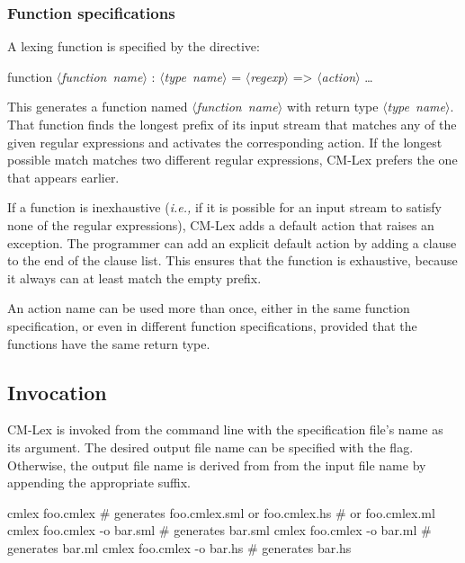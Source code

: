 \documentclass[10pt]{article}
\newcommand{\nonterm}[1]{\mbox{$\langle${\it{}#1}$\rangle$}}
\begin{document}
\subsubsection{Function specifications}

A lexing function is specified by the directive:

\begin{code}
function \nonterm{function name} : \nonterm{type name} =
   \nonterm{regexp} => \nonterm{action}
   \dots
\end{code}

This generates a function named \nonterm{function name} with return type
\nonterm{type name}.  That function finds the longest prefix of its input
stream that matches any of the given regular expressions and activates
the corresponding action.  If the longest possible match matches two
different regular expressions, CM-Lex prefers the one that appears
earlier.

If a function is inexhaustive ({\em i.e.,} if it is possible for an input
stream to satisfy none of the regular expressions), CM-Lex adds a
default action that raises an exception.  The programmer can add an
explicit default action by adding a clause 
to the end of the clause list.  This ensures that the function is
exhaustive, because it always can at least match the empty prefix.

An action name can be used more than once, either in the same function
specification, or even in different function specifications, provided
that the functions have the same return type.


\subsection{Invocation}

CM-Lex is invoked from the command line with the specification file's
name as its argument.  The desired output file name can be specified
with the  flag.  Otherwise, the output file name is derived from from
the input file name by appending the appropriate suffix.

\begin{code}
cmlex foo.cmlex               # generates foo.cmlex.sml or foo.cmlex.hs
                              #   or foo.cmlex.ml
cmlex foo.cmlex -o bar.sml    # generates bar.sml
cmlex foo.cmlex -o bar.ml     # generates bar.ml
cmlex foo.cmlex -o bar.hs     # generates bar.hs
\end{code}
\end{document}
